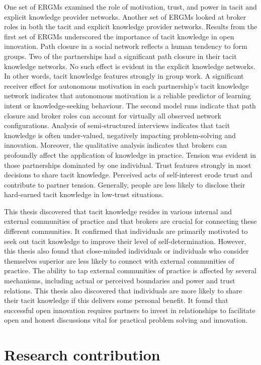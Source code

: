 One set of ERGMs examined the role of motivation, trust, and power in tacit and explicit knowledge provider networks. Another set of ERGMs looked at broker roles in both the tacit and explicit knowledge provider networks. Results from the first set of ERGMs underscored the importance of tacit knowledge in open innovation. Path closure in a social network reflects a human tendency to form groups. Two of the partnerships had a significant path closure in their tacit knowledge networks. No such effect is evident in the explicit knowledge networks. In other words, tacit knowledge features strongly in group work. A significant receiver effect for autonomous motivation in each partnership's tacit knowledge network indicates that autonomous motivation is a reliable predictor of learning intent or knowledge-seeking behaviour. The second model runs indicate that path closure and broker roles can account for virtually all observed network configurations. Analysis of semi-structured interviews indicates that tacit knowledge is often under-valued, negatively impacting problem-solving and innovation. Moreover, the qualitative analysis indicates that brokers can profoundly affect the application of knowledge in practice. Tension was evident in those partnerships dominated by one individual. Trust features strongly in most decisions to share tacit knowledge. Perceived acts of self-interest erode trust and contribute to partner tension. Generally, people are less likely to disclose their hard-earned tacit knowledge in low-trust situations. \medskip

This thesis discovered that tacit knowledge resides in various internal and external communities of practice and that brokers are crucial for connecting these different communities. It confirmed that individuals are primarily motivated to seek out tacit knowledge to improve their level of self-determination. However, this thesis also found that close-minded individuals or individuals who consider themselves superior are less likely to connect with external communities of practice. The ability to tap external communities of practice is affected by several mechanisms, including actual or perceived boundaries and power and trust relations. This thesis also discovered that individuals are more likely to share their tacit knowledge if this delivers some personal benefit. It found that successful open innovation requires partners to invest in relationships to facilitate open and honest discussions vital for practical problem solving and innovation.

\section{Research contribution}

